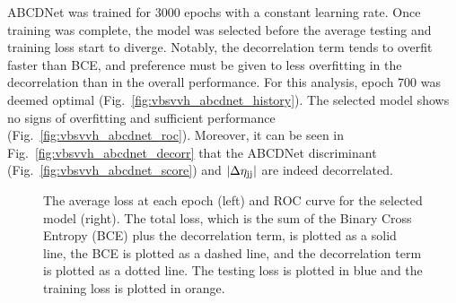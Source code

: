 ABCDNet was trained for 3000 epochs with a constant learning rate. 
Once training was complete, the model was selected before the average testing and training loss start to diverge. 
Notably, the decorrelation term tends to overfit faster than BCE, and preference must be given to less overfitting in the decorrelation than in the overall performance. 
For this analysis, epoch 700 was deemed optimal (Fig.~\ref{fig:vbsvvh_abcdnet_history}).
The selected model shows no signs of overfitting and sufficient performance (Fig.~\ref{fig:vbsvvh_abcdnet_roc}). 
Moreover, it can be seen in Fig.~\ref{fig:vbsvvh_abcdnet_decorr} that the ABCDNet discriminant (Fig.~\ref{fig:vbsvvh_abcdnet_score}) and $|\Delta\eta_{\mathrm{j}\mathrm{j}}|$ are indeed decorrelated.

\begin{figure}[htb]
    \centering
    \qquad
    \caption[The average loss at each epoch and ROC curve for the selected ABCDNet model]{
        The average loss at each epoch (left) and ROC curve for the selected model (right). 
        The total loss, which is the sum of the Binary Cross Entropy (BCE) plus the decorrelation term, is plotted as a solid line, the BCE is plotted as a dashed line, and the decorrelation term is plotted as a dotted line. 
        The testing loss is plotted in blue and the training loss is plotted in orange. 
    }
    \label{fig:vbsvvh_abcdnet_perf}
\end{figure}

